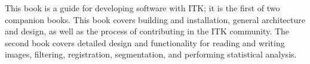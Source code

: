 This book is a guide for developing software with ITK; it is the first of two
companion books. This book covers building and installation, general
architecture and design, as well as the process of contributing in the ITK
community. The second book covers detailed design and functionality for
reading and writing images, filtering, registration, segmentation, and
performing statistical analysis.
